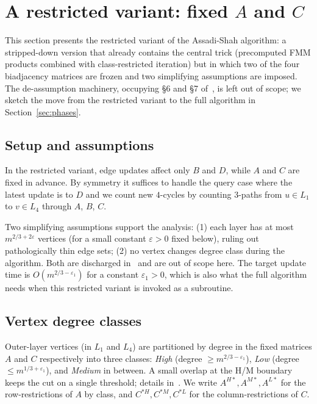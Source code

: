 \documentclass[sigconf,nonacm]{acmart}
\theoremstyle{plain}
\theoremstyle{definition}
\begin{document}
\section{A restricted variant: fixed $A$ and $C$}
\label{sec:warmup}

This section presents the restricted variant of the
Assadi-Shah algorithm: a stripped-down version that already
contains the central trick (precomputed FMM products combined with
class-restricted iteration) but in which two of the four
biadjacency matrices are frozen and two simplifying assumptions
are imposed. The de-assumption machinery, occupying §6 and §7
of~\cite{AssadiShah25}, is left out of scope; we sketch the move
from the restricted variant to the full algorithm in
Section~\ref{sec:phases}.

\subsection{Setup and assumptions}
\label{sec:warmup:setup}
In the restricted variant, edge updates affect only $B$ and $D$,
while $A$ and $C$ are fixed in advance. By symmetry it suffices to
handle the query case where the latest update is to $D$ and we
count new $4$-cycles by counting $3$-paths from $u \in L_1$ to
$v \in L_4$ through $A$, $B$, $C$.

Two simplifying assumptions support the analysis: (1) each layer
has at most $m^{2/3+2\varepsilon}$ vertices (for a small constant
$\varepsilon > 0$ fixed below), ruling out pathologically thin
edge sets; (2) no vertex changes degree class during the algorithm.
Both are discharged
in~\cite[\S\S6--7]{AssadiShah25} and are out of scope here. The
target update time is $O(m^{2/3-\varepsilon_1})$ for a constant
$\varepsilon_1 > 0$, which is also what the full algorithm needs
when this restricted variant is invoked as a subroutine.

\subsection{Vertex degree classes}
\label{sec:warmup:classes}
Outer-layer vertices (in $L_1$ and $L_4$) are partitioned by degree
in the fixed matrices $A$ and $C$ respectively into three classes:
\emph{High} (degree $\ge m^{2/3-\varepsilon_1}$), \emph{Low}
(degree $\le m^{1/3+\varepsilon_1}$), and \emph{Medium} in between.
A small overlap at the H/M boundary keeps the cut on a single
threshold; details in~\cite[\S3.1]{AssadiShah25}. We write
$A^{H*}, A^{M*}, A^{L*}$ for the row-restrictions of $A$ by class,
and $C^{*H}, C^{*M}, C^{*L}$ for the column-restrictions of $C$.
\end{document}
